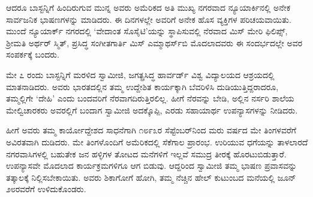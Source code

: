 ಆದರೂ ಬಾಸ್ಟನ್ನಿಗೆ ಹಿಂದಿರುಗುವ ಮುನ್ನ ಅವರು ಅಮೆರಿಕದ ಅತಿ ಮುಖ್ಯ ನಗರವಾದ ನ್ಯೂಯಾರ್ಕಿನಲ್ಲಿ ಅನೇಕ ಸಾರ್ವಜನಿಕ ಭಾಷಣಗಳನ್ನು ಮಾಡಿದರು. ಈ ದಿನಗಳಲ್ಲೇ ಅವರಿಗೆ ಅನೇಕ ಹೊಸ ವ್ಯಕ್ತಿಗಳ ಪರಿಚಯವಾಯಿತು. ಮುಂದೆ ನ್ಯೂಯಾರ್ಕ್ ನಗರದಲ್ಲಿ ‘ವೇದಾಂತ ಸೊಸೈಟಿ’ಯನ್ನು ಸ್ಥಾಪಿಸುವಲ್ಲಿ ನೆರವಾದ ಮಿಸ್ ಮೇರಿ ಫಿಲಿಪ್ಸ್, ಶ್ರೀಮತಿ ಅರ್ಥರ್ ಸ್ಮಿತ್, ಪ್ರಸಿದ್ಧ ಸಂಗೀತಗಾರ್ತಿ ಮಿಸ್ ಎಮ್ಮಾಥರ್ಸ್​ಬಿ ಮೊದಲಾದವರು ಈ ಸಂದರ್ಭದಲ್ಲೇ ಅವರ ಸಂಪರ್ಕಕ್ಕೆ ಬಂದರು.

ಮೇ ೭ ರಂದು ಬಾಸ್ಟನ್ನಿಗೆ ಮರಳಿದ ಸ್ವಾಮೀಜಿ, ಜಗತ್ಪ್ರಸಿದ್ಧ ಹಾರ್ವರ್ಡ್ ವಿಶ್ವ ವಿದ್ಯಾಲಯದ ಆಶ್ರಯದಲ್ಲಿ ಮಾತನಾಡಿದರು. ಅವರು ಭಾರತದಲ್ಲಿನ ತಮ್ಮ ಉದ್ದೇಶಿತ ಕಾರ್ಯಕ್ಕಾಗಿ ಬೆವರಿಳಿಸಿ ದುಡಿಯುತ್ತಿದ್ದರಾದರೂ, ತಮ್ಮಲ್ಲಿಗೇ ‘ದೇಹಿ’ ಎಂದು ಬಂದವರಿಗೆ ನೆರವಾಗದಿರುತ್ತಿರಲಿಲ್ಲ. ಹೀಗೆ ನೆರವನ್ನು ಬೇಡಿ, ಅಲ್ಲಿನ ನರ್ಸರಿ ಶಾಲೆಯ ಮೇಲ್ವಿಚಾರಕರು ಅವರಲ್ಲಿಗೆ ಬಂದಾಗ ಸ್ವಾಮೀಜಿ ಅದಕ್ಕೊಪ್ಪಿ, ಎರಡು ಸಹಾಯಾರ್ಥ ಉಪನ್ಯಾಸಗಳನ್ನು ನೀಡಿದರು.

ಹೀಗೆ ಅವರು ತಮ್ಮ ಕಾರ್ಯೋದ್ದೇಶದ ಸಾಧನೆಗಾಗಿ ೧೮೯೩ರ ಸೆಪ್ಟೆಂಬರ್​ನಿಂದ ಮರು ವರ್ಷದ ಮೇ ತಿಂಗಳವರೆಗೆ ಅವಿರತವಾಗಿ ದುಡಿದರು. ಮೇ ತಿಂಗಳೊಂದಿಗೆ ಅಮೆರಿಕದಲ್ಲಿ ಸೆಕೆಗಾಲ ಪ್ರಾರಂಭ. ಉರಿಯುವ ಧಗೆಯನ್ನು ತಾಳಲಾರದೆ ನಗರವಾಸಿಗಳಲ್ಲಿ ಬಹುತೇಕ ಜನ ಹಳ್ಳಿಗಳ ತೋಟದ ಮನೆಗಳಿಗೆ ಇಲ್ಲವೆ ಸಮುದ್ರ ತೀರಕ್ಕೆ ಹೊರಟುಬಿಡುತ್ತಾರೆ. ಉಪನ್ಯಾಸವೇ ಮೊದಲಾದ ಕಾರ್ಯಕ್ರಮಗಳಿಗೂ ಆಗ ಬಿಡುವು. ಆದ್ದರಿಂದ ಸ್ವಾಮೀಜಿ ತಮ್ಮ ಭಾಷಣ ಪ್ರವಾಸವನ್ನು ತತ್ಕಾಲಕ್ಕೆ ನಿಲ್ಲಿಸಬೇಕಾಯಿತು. ಅವರು ಶಿಕಾಗೋಗೆ ಹೋಗಿ, ತಮ್ಮ ನೆಚ್ಚಿನ ಹೇಲ್ ಕುಟುಂಬದ ಮನೆಯಲ್ಲಿ ಜೂನ್ ೨೮ರವರೆಗೆ ಉಳಿದುಕೊಂಡರು.


